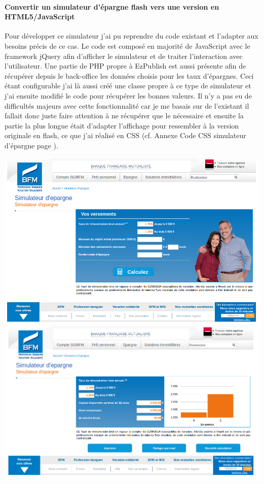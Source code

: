 \documentclass[a4paper,11pt,twoside]{report}
\begin{document}
      \paragraph*{Convertir un simulateur d'épargne flash vers une version en HTML5/JavaScript}
      Pour développer ce simulateur j'ai pu reprendre du code existant et l'adapter aux besoins précis de ce cas. Le code est composé en majorité de JavaScript avec le framework jQuery afin d'afficher le simulateur et de traiter l'interaction avec l'utilisateur. Une partie de PHP propre à EzPublish est aussi présente afin de récupérer depuis le back-office les données choisis pour les taux d'épargnes. Ceci étant configurable j'ai là aussi créé une classe propre à ce type de simulateur et j'ai ensuite modifié le code pour récupérer les bonnes valeurs. Il n'y a pas eu de difficultés majeurs avec cette fonctionnalité car je me basais sur de l'existant il fallait donc juste faire attention à ne récupérer que le nécessaire et ensuite la partie la plus longue était d'adapter l'affichage pour ressembler à la version originale en flash, ce que j'ai réalisé en CSS (cf. Annexe Code CSS simulateur d'épargne page \pageref{code_CSS_simulateur_d_epargne}).
      \begin{center}
	\includegraphics[width=\textwidth]{images/simu_epargne1.png} 
	\includegraphics[width=\textwidth]{images/simu_epargne2.png} 
	\label{epargne_simulator}
      \end{center}
\end{document}
